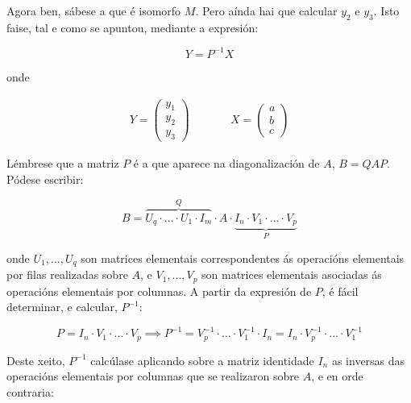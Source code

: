 \documentclass[twoside]{report}
\theoremstyle{mystyle}
\begin{document}
\vspace{3mm}

\noindent Agora ben, sábese a que é isomorfo $M$. Pero aínda hai que calcular $y_{2}$ e $y_{3}$. Isto faise, tal e como se apuntou, mediante a expresión:

\begin{equation}\label{ec4.3}
Y = P^{-1}X
\end{equation}

\vspace{3mm}

\noindent onde

\begin{align*}
    Y = 
    \begin{pmatrix}
    y_{1} \\ y_{2} \\ y_{3}
    \end{pmatrix}
    &
    \qquad
    &
    X = 
    \begin{pmatrix}
    a \\ b \\ c
    \end{pmatrix}
\end{align*}

\vspace{3mm}

\noindent Lémbrese que a matriz $P$ é a que aparece na diagonalización de $A$, $B = QAP$. Pódese escribir:

$$B = \overbrace{U_{q} \cdot \dots \cdot U_{1} \cdot I_{m}}^{Q} \cdot A \cdot \underbrace{I_{n} \cdot V_{1} \cdot \dots \cdot V_{p}}_{P}$$

\noindent onde $U_{1}, \dots, U_{q}$ son matrices elementais correspondentes ás operacións elementais por filas realizadas sobre $A$, e $V_{1}, \dots, V_{p}$ son matrices elementais asociadas ás operacións elementais por columnas. A partir da expresión de $P$, é fácil determinar, e calcular, $P^{-1}$:

$$P = I_{n} \cdot V_{1} \cdot \dots \cdot V_{p} \implies P^{-1} = V_{p}^{-1} \cdot \dots \cdot V_{1}^{-1} \cdot I_{n} = I_{n} \cdot V_{p}^{-1} \cdot \dots \cdot V_{1}^{-1}
$$

\vspace{3mm}

\noindent Deste xeito, $P^{-1}$ calcúlase aplicando sobre a matriz identidade $I_{n}$ as inversas das operacións elementais por columnas que se realizaron sobre $A$, e en orde contraria:\\
\end{document}
